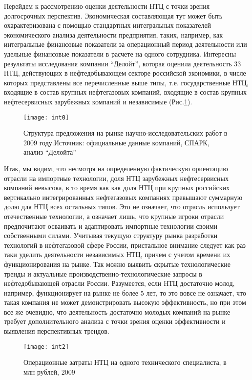 Перейдем к рассмотрению оценки деятельности НТЦ с точки зрения долгосрочных перспектив.
Экономическая составляющая тут может быть охарактеризована с помощью стандартных интегральных показателей экономического анализа деятельности предприятия, таких, например, как интегральные финансовые показатели за операционный период деятельности или удельные финансовые показатели в расчете на одного сотрудника.
Интересны результаты исследования компании ``Делойт'', которая оценила деятельность 33 НТЦ, действующих в нефтедобывающем секторе российской экономики, в числе которых представлены все перечисленные выше типы, т.е. государственные НТЦ, входящие в состав крупных нефтегазовых компаний, входящие в состав крупных нефтесервисных зарубежных компаний и независимые (Рис.\ref{fig:int0}).
\begin{figure}[ht!]
	\caption{Структура предложения на рынке научно-исследовательских работ в 2009 году.Источник: официальные данные компаний, СПАРК, анализ ``Делойта''}  
	\centering     
	\texttt{[image: int0]}   
	\label{fig:int0} 
\end{figure}   

Итак, мы видим, что несмотря на определенную фактическую ориентацию отрасли на импортные технологии, доля НТЦ зарубежных нефтесервисных компаний невысока, в то время как как доля НТЦ при крупных российских вертикально интегрированных нефтегазовых компаниях превышают суммарную долю для НТЦ всех остальных типов.
Это не означает, что отрасль использует отечественные технологии, а означает лишь, что крупные игроки отрасли предпочитают осваивать и адаптировать импортные технологии своими собственными силами.
Учитывая текущую структуру рынка разработки технологий в нефтегазовой сфере России, пристальное внимание следует как раз таки уделить деятельности независимых НТЦ, причем с учетом времени их функционирования на рынке.
Так можно выявить скрытые технологические тренды и актуальные производственно-технологические запросы в нефтедобывающей отрасли России.
Разумеется, если НТЦ достаточно молод, например, функционирует на рынке не более 5 лет, то это вовсе не означает, что такая компания не может демонстрировать высокую эффективность, но при этом все же очевидно, что деятельность достаточно молодых компаний на рынке требует дополнительного анализа с точки зрения оценки эффективности и выявления перспективных трендов.

 \begin{figure}[H]
 	\caption{Операционные затраты НТЦ на одного технического специалиста, в млн рублей, 2009}
	\centering     
	\texttt{[image: int2]}   
	\label{fig:int2} 
\end{figure}   

